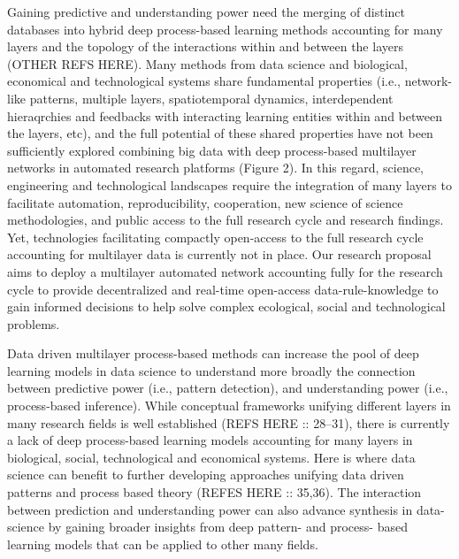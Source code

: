\documentclass[authoryear,1p,12pt]{elsarticle}
\begin{document}
Gaining predictive and understanding power need the merging of
distinct databases into hybrid deep process-based learning methods
accounting for many layers and the topology of the interactions within
and between the
layers\citep{Schmidhuber:2015,Ghahramani:2015,Melianetal:2018,Reichsteietal2019}
(OTHER REFS HERE). Many methods from data science and biological,
economical and technological systems share fundamental properties
(i.e., network-like patterns, multiple layers, spatiotemporal
dynamics, interdependent hieraqrchies and feedbacks with interacting
learning entities within and between the layers, etc), and the full
potential of these shared properties have not been sufficiently
explored combining big data with deep process-based multilayer
networks in automated research platforms (Figure 2). In this regard,
science, engineering and technological landscapes require the
integration of many layers to facilitate automation, reproducibility,
cooperation, new science of science methodologies, and public access
to the full research cycle and research findings. Yet, technologies
facilitating compactly open-access to the full research cycle
accounting for multilayer data is currently not in place. Our research
proposal aims to deploy a multilayer automated network accounting
fully for the research cycle to provide decentralized and real-time
open-access data-rule-knowledge to gain informed decisions to help
solve complex ecological, social and technological problems.

Data driven multilayer process-based methods can increase the pool of
deep learning models in data science to understand more broadly the
connection between predictive power (i.e., pattern detection), and
understanding power (i.e., process-based inference). While conceptual
frameworks unifying different layers in many research fields is well
established (REFS HERE :: 28–31), there is currently a lack of deep
process-based learning models accounting for many layers in
biological, social, technological and economical systems. Here is
where data science can benefit to further developing approaches
unifying data driven patterns and process based theory (REFES HERE ::
35,36). The interaction between prediction and understanding power
can also advance synthesis in data-science by gaining broader
insights from deep pattern- and process- based learning models that
can be applied to other many fields.
\end{document}
